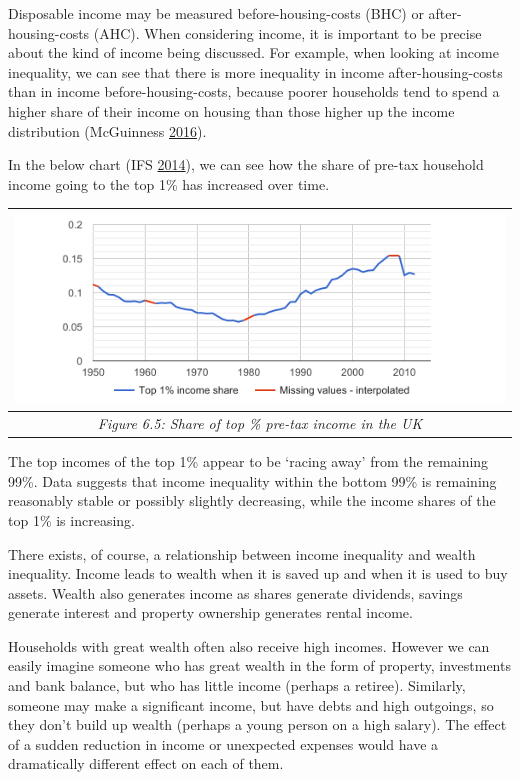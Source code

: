 \documentclass[]{tufte-handout}
\begin{document}
Disposable income may be measured before-housing-costs (BHC) or
after-housing-costs (AHC). When considering income, it is important to
be precise about the kind of income being discussed. For example, when
looking at income inequality, we can see that there is more inequality
in income after-housing-costs than in income before-housing-costs,
because poorer households tend to spend a higher share of their income
on housing than those higher up the income distribution (McGuinness
\protect\hyperlink{ref-McGuinness2016}{2016}).

In the below chart (IFS \protect\hyperlink{ref-IFS2014}{2014}), we can
see how the share of pre-tax household income going to the top 1\% has
increased over time.

\begin{longtable}[]{@{}c@{}}
\toprule
\includegraphics{ChapterPictures/6-4-ShareOfTopIncome.png}\tabularnewline
\midrule
\endhead
\emph{Figure 6.5: Share of top \% pre-tax income in the
UK}\tabularnewline
\bottomrule
\end{longtable}

The top incomes of the top 1\% appear to be `racing away' from the
remaining 99\%. Data suggests that income inequality within the bottom
99\% is remaining reasonably stable or possibly slightly decreasing,
while the income shares of the top 1\% is increasing.

There exists, of course, a relationship between income inequality and
wealth inequality. Income leads to wealth when it is saved up and when
it is used to buy assets. Wealth also generates income as shares
generate dividends, savings generate interest and property ownership
generates rental income.

Households with great wealth often also receive high incomes. However we
can easily imagine someone who has great wealth in the form of property,
investments and bank balance, but who has little income (perhaps a
retiree). Similarly, someone may make a significant income, but have
debts and high outgoings, so they don't build up wealth (perhaps a young
person on a high salary). The effect of a sudden reduction in income or
unexpected expenses would have a dramatically different effect on each
of them.
\end{document}
